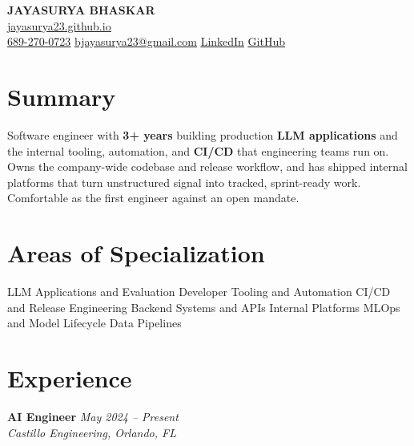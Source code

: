 \documentclass[11pt,letterpaper]{article}
\newcommand{\jobentry}[3]{%
\noindent
\colorbox{bandgray}{%
\begin{minipage}{\dimexpr\linewidth-2\fboxsep-2\fboxrule\relax}
\vspace{2pt}
{\bfseries #1} \hfill {\itshape #3}\\[-0.5pt]
{\itshape #2}
\vspace{2pt}
\end{minipage}%
}%
}
\begin{document}
\raggedright

\begin{center}
{\LARGE \textbf{JAYASURYA BHASKAR}}\\[5pt]
{\large \href{https://jayasurya23.github.io}{\textcolor{blue!70!black}{\underline{jayasurya23.github.io}}}}\\[4pt]
{\small
\href{tel:6892700723}{\underline{689-270-0723}} \;\textbar\;
\href{mailto:bjayasurya23@gmail.com}{\underline{bjayasurya23@gmail.com}} \;\textbar\;
\href{https://www.linkedin.com/in/jayasurya-b/}{\underline{LinkedIn}} \;\textbar\;
\href{https://github.com/jayasurya23}{\underline{GitHub}}}
\end{center}

\vspace{-2pt}

\section{Summary}

Software engineer with \textbf{3+ years} building production \textbf{LLM
applications} and the internal tooling, automation, and \textbf{CI/CD} that
engineering teams run on. Owns the company-wide codebase and release workflow,
and has shipped internal platforms that turn unstructured signal into tracked,
sprint-ready work. Comfortable as the first engineer against an open mandate.

\section{Areas of Specialization}

LLM Applications and Evaluation \;\textbullet\; Developer Tooling and Automation
\;\textbullet\; CI/CD and Release Engineering \;\textbullet\; Backend Systems and APIs
\;\textbullet\; Internal Platforms \;\textbullet\; MLOps and Model Lifecycle
\;\textbullet\; Data Pipelines

\section{Experience}

\jobentry{AI Engineer}{Castillo Engineering, Orlando, FL}{May 2024 -- Present}
\end{document}
